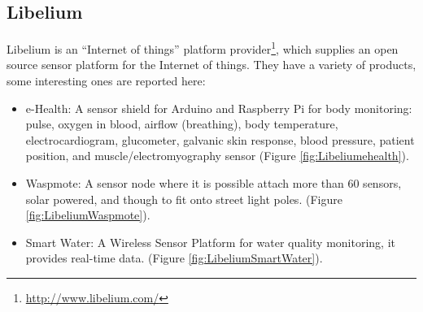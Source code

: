 \documentclass[12pt, a4paper,twoside]{tesi_upf}
\begin{document}
    \subsection{Libelium}
      Libelium is an ``Internet of things'' platform provider\footnote{\url{http://www.libelium.com/}}, which supplies an open source sensor platform for the Internet of things.
      They have a variety of products, some interesting ones are reported here:
      \begin{itemize}
        \item e-Health: A sensor shield for Arduino and Raspberry Pi for body monitoring: pulse, oxygen in blood, airflow (breathing), body temperature, electrocardiogram, glucometer, galvanic skin response, blood pressure, patient position, and muscle/electromyography sensor (Figure \ref{fig:Libeliumehealth}).
        
        \item Waspmote: A sensor node where it is possible attach more than 60 sensors, solar powered, and though to fit onto street light poles. (Figure \ref{fig:LibeliumWaspmote}).
       
       \item Smart Water: A Wireless Sensor Platform for water quality monitoring, it provides real-time data. (Figure \ref{fig:LibeliumSmartWater}).
     \end{itemize}
      
\end{document}
